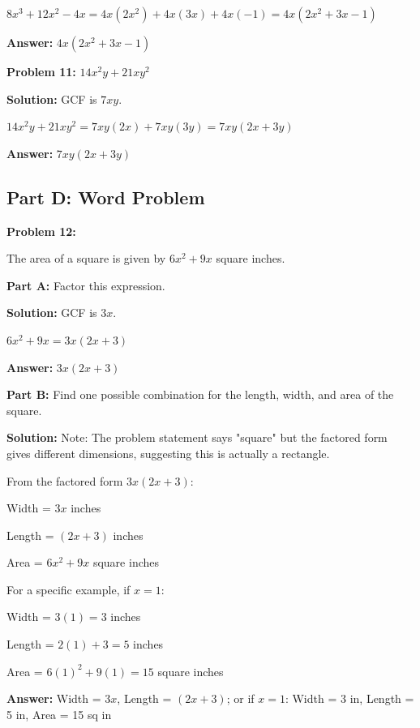 \documentclass[12pt]{article}
\begin{document}
		$8x^3 + 12x^2 - 4x = 4x(2x^2) + 4x(3x) + 4x(-1) = 4x(2x^2 + 3x - 1)$
		
		\textbf{Answer:} $4x(2x^2 + 3x - 1)$

		\vspace{0.5cm}

		\textbf{Problem 11:} $14x^2y + 21xy^2$
		
		\textbf{Solution:} GCF is $7xy$.
		
		$14x^2y + 21xy^2 = 7xy(2x) + 7xy(3y) = 7xy(2x + 3y)$
		
		\textbf{Answer:} $7xy(2x + 3y)$

	\newpage

	\subsection*{Part D: Word Problem}

		\textbf{Problem 12:}
		
		The area of a square is given by $6x^2 + 9x$ square inches.
		
		\textbf{Part A:} Factor this expression.
		
		\textbf{Solution:} GCF is $3x$.
		
		$6x^2 + 9x = 3x(2x + 3)$
		
		\textbf{Answer:} $3x(2x + 3)$

		\vspace{0.5cm}

		\textbf{Part B:} Find one possible combination for the length, width, and area of the square.
		
		\textbf{Solution:} Note: The problem statement says "square" but the factored form gives different dimensions, suggesting this is actually a rectangle.
		
		From the factored form $3x(2x + 3)$:
		
		Width = $3x$ inches
		
		Length = $(2x + 3)$ inches
		
		Area = $6x^2 + 9x$ square inches
		
		For a specific example, if $x = 1$:
		
		Width = $3(1) = 3$ inches
		
		Length = $2(1) + 3 = 5$ inches
		
		Area = $6(1)^2 + 9(1) = 15$ square inches
		
		\textbf{Answer:} Width = $3x$, Length = $(2x + 3)$; or if $x = 1$: Width = 3 in, Length = 5 in, Area = 15 sq in

\newpage
\end{document}
